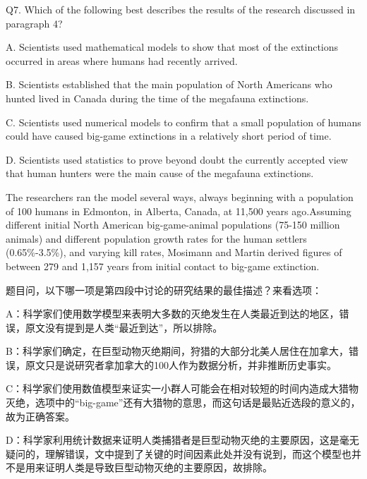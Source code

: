 \begin{blk}
    \begin{qst}
        Q7.
        Which of the following best describes the results of the research discussed in paragraph 4?
    \end{qst}

    \begin{chc}
        A.
        Scientists used mathematical models to show that most of the extinctions occurred in areas where humans had recently arrived.

        B.
        Scientists established that the main population of North Americans who hunted lived in Canada during the time of the megafauna extinctions.

        C.
        Scientists used numerical models to confirm that a small population of humans could have caused big-game extinctions in a relatively short period of time.

        D.
        Scientists used statistics to prove beyond doubt the currently accepted view that human hunters were the main cause of the megafauna extinctions.
    \end{chc}

    \begin{psgq}
        The researchers ran the model several ways, always beginning with a population of 100 humans in Edmonton, in Alberta, Canada, at 11,500 years ago.Assuming different initial North American big-game-animal populations (75-150 million animals) and different population growth rates for the human settlers (0.65\%-3.5\%), and varying kill rates, Mosimann and Martin derived figures of between 279 and 1,157 years from initial contact to big-game extinction.
    \end{psgq}

    \begin{nlz}
        题目问，以下哪一项是第四段中讨论的研究结果的最佳描述？来看选项：

        A：科学家们使用数学模型来表明大多数的灭绝发生在人类最近到达的地区，错误，原文没有提到是人类“最近到达”，所以排除。

        B：科学家们确定，在巨型动物灭绝期间，狩猎的大部分北美人居住在加拿大，错误，原文只是说研究者拿加拿大的100人作为数据分析，并非推断历史事实。

        C：科学家们使用数值模型来证实一小群人可能会在相对较短的时间内造成大猎物灭绝，选项中的“big-game”还有大猎物的意思，而这句话是最贴近选段的意义的，故为正确答案。

        D：科学家利用统计数据来证明人类捕猎者是巨型动物灭绝的主要原因，这是毫无疑问的，理解错误，文中提到了关键的时间因素此处并没有说到，而这个模型也并不是用来证明人类是导致巨型动物灭绝的主要原因，故排除。
    \end{nlz}
\end{blk}


